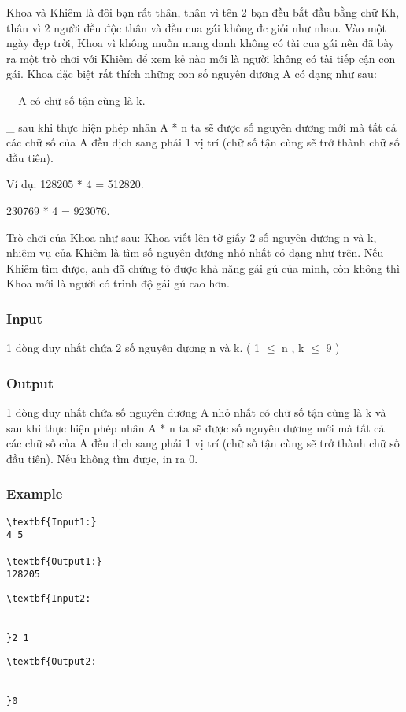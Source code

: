 



   Khoa và Khiêm là đôi bạn rất thân, thân vì tên 2 bạn đều bắt đầu bằng chữ Kh, thân vì 2 người đều độc thân và đều cua gái không đc giỏi như nhau. Vào một ngày đẹp trời, Khoa vì không muốn mang danh không có tài cua gái nên đã bày ra một trò chơi với Khiêm để xem kẻ nào mới là người không có tài tiếp cận con gái. Khoa đặc biệt rất thích những con số nguyên dương A có dạng như sau:   


   \_ A có chữ số tận cùng là k.   


   \_ sau khi thực hiện phép nhân A * n ta sẽ được số nguyên dương mới mà tất cả các chữ số của A đều dịch sang phải 1 vị trí (chữ số tận cùng sẽ trở thành chữ số đầu tiên).   


   Ví dụ:      128205 * 4 = 512820.   


   230769 * 4 = 923076.  

   Trò chơi của Khoa như sau: Khoa viết lên tờ giấy 2 số nguyên dương n và k, nhiệm vụ của Khiêm là tìm số nguyên dương nhỏ nhất có dạng như trên. Nếu Khiêm tìm được, anh đã chứng tỏ được khả năng gái gú của mình, còn không thì Khoa mới là người có trình độ gái gú cao hơn.  

\subsubsection{   Input  }

   1 dòng duy nhất chứa 2 số nguyên dương n và k. ( 1  $\le$  n , k  $\le$  9 )  

\subsubsection{   Output  }

   1 dòng duy nhất chứa số nguyên dương A nhỏ nhất có chữ số tận cùng là k và sau khi thực hiện phép nhân A * n ta sẽ được số nguyên dương mới mà tất cả các chữ số của A đều dịch sang phải 1 vị trí (chữ số tận cùng sẽ trở thành chữ số đầu tiên). Nếu không tìm được, in ra 0.  

\subsubsection{   Example  }
\begin{verbatim}
\textbf{Input1:}
4 5

\textbf{Output1:}
128205\end{verbatim}
\begin{verbatim}
\textbf{Input2:


}2 1\end{verbatim}
\begin{verbatim}
\textbf{Output2:


}0\end{verbatim}
